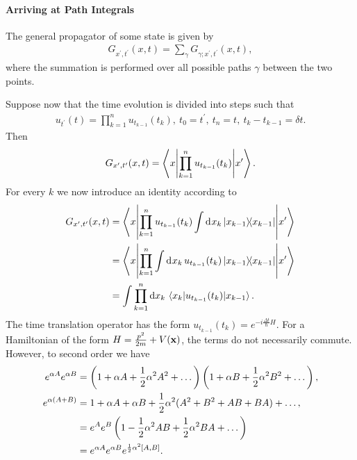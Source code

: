 \paragraph{Arriving at Path Integrals}
The general propagator of some state is given by
\begin{align*}
	G_{x^{\prime}, t^{\prime}}(x, t) = \sum\limits_{\gamma}G_{\gamma; x^{\prime}, t^{\prime}}(x, t),
\end{align*}
where the summation is performed over all possible paths $\gamma$ between the two points.

Suppose now that the time evolution is divided into steps such that
\begin{align*}
	u_{t^{\prime}}(t) = \prod\limits_{k = 1}^{n}u_{t_{k - 1}}(t_{k}),\ t_{0} = t^{\prime},\ t_{n} = t,\ t_{k} - t_{k - 1} = \delta t.
\end{align*}
Then
\begin{align*}
	G_{x^{\prime}, t^{\prime}}(x, t) = \mel**{x}{\prod\limits_{k = 1}^{n}u_{t_{k - 1}}(t_{k})}{x^{\prime}}.
\end{align*}
For every $k$ we now introduce an identity according to
\begin{align*}
	G_{x^{\prime}, t^{\prime}}(x, t) &= \mel**{x}{\prod\limits_{k = 1}^{n}u_{t_{k - 1}}(t_{k})\int\limits_{}^{}\dd[]{x_{k}}\op{x_{k - 1}}{x_{k - 1}}}{x^{\prime}} \\
	                                 &= \mel**{x}{\prod\limits_{k = 1}^{n}\int\limits_{}^{}\dd[]{x_{k}}u_{t_{k - 1}}(t_{k})\op{x_{k - 1}}{x_{k - 1}}}{x^{\prime}} \\
	                                 &= \int\prod\limits_{k = 1}^{n}\dd{x_{k}}\mel{x_{k}}{u_{t_{k - 1}}(t_{k})}{x_{k - 1}}.
\end{align*}
The time translation operator has the form $u_{t_{k - 1}}(t_{k}) = e^{-i\frac{\Delta t}{\hbar}H}$. For a Hamiltonian of the form $H = \frac{p^{2}}{2m} + V(\vb{x})$, the terms do not necessarily commute. However, to second order we have
\begin{align*}
	e^{\alpha A}e^{\alpha B} &= \left(1 + \alpha A + \frac{1}{2}\alpha^{2}A^{2} + \dots\right)\left(1 + \alpha B + \frac{1}{2}\alpha^{2}B^{2} + \dots\right), \\
	e^{\alpha(A + B)}  &= 1 + \alpha A + \alpha B + \frac{1}{2}\alpha^{2}(A^{2} + B^{2} + AB + BA) + \dots, \\
	           &= e^{A}e^{B}\left(1 - \frac{1}{2}\alpha^{2}AB + \frac{1}{2}\alpha^{2}BA + \dots\right) \\
	           &= e^{\alpha A}e^{\alpha B}e^{\frac{1}{2}\alpha^{2}\comm{A}{B}}.
\end{align*}
